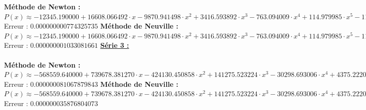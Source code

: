\documentclass{report}
\begin{document}
	\textbf{Méthode de Newton :}\\
	$P(x) \approx -12345.190000 + 16608.066492 \cdot x- 9870.941498 \cdot x^{2}  + 3416.593892 \cdot x^{3} - 763.094009 \cdot x^{4}  + 114.979985 \cdot x^{5} - 11.842442 \cdot x^{6}  + 0.823658 \cdot x^{7} - 0.037039 \cdot x^{8}  + 0.000973 \cdot x^{9} - 0.000011 \cdot x^{10} $\\
	Erreur : $0.000000000774325735$
	\newline
	\newline
	\textbf{Méthode de Neuville :}\\
	$P(x) \approx -12345.190000 + 16608.066492 \cdot x- 9870.941498 \cdot x^{2}  + 3416.593892 \cdot x^{3} - 763.094009 \cdot x^{4}  + 114.979985 \cdot x^{5} - 11.842442 \cdot x^{6}  + 0.823658 \cdot x^{7} - 0.037039 \cdot x^{8}  + 0.000973 \cdot x^{9} - 0.000011 \cdot x^{10} $\\
	Erreur : $0.000000001033081661$
	\newline
	\newline
	\newline
	\underline{\textbf{Série 3 :}} \\ \\
	\textbf{Méthode de Newton :}\\
	$P(x) \approx -568559.640000 + 739678.381270 \cdot x- 424130.450858 \cdot x^{2}  + 141275.523224 \cdot x^{3} - 30298.693006 \cdot x^{4}  + 4375.222059 \cdot x^{5} - 431.155992 \cdot x^{6}  + 28.652640 \cdot x^{7} - 1.229803 \cdot x^{8}  + 0.030806 \cdot x^{9} - 0.000342 \cdot x^{10} $\\
	Erreur : $0.000000081067879843$
	\newline
	\newline
	\textbf{Méthode de Neuville :}\\
	$P(x) \approx -568559.640000 + 739678.381270 \cdot x- 424130.450858 \cdot x^{2}  + 141275.523224 \cdot x^{3} - 30298.693006 \cdot x^{4}  + 4375.222059 \cdot x^{5} - 431.155992 \cdot x^{6}  + 28.652640 \cdot x^{7} - 1.229803 \cdot x^{8}  + 0.030806 \cdot x^{9} - 0.000342 \cdot x^{10} $\\
	Erreur : $0.000000035876804073$
	\newpage
\end{document}
